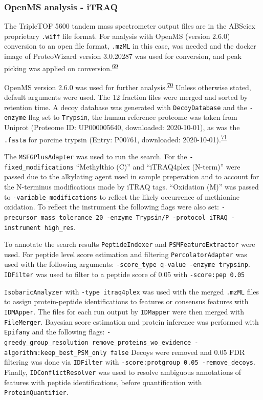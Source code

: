\documentclass[
]{article}
\begin{document}
\hypertarget{openms-chap3}{%
\subsubsection{OpenMS analysis - iTRAQ}\label{openms-chap3}}

The TripleTOF 5600 tandem mass spectrometer output files are in the ABSciex proprietary \texttt{.wiff} file format.
For analysis with OpenMS (version 2.6.0) conversion to an open file format, \texttt{.mzML} in this case, was needed and the docker image of ProteoWizard version 3.0.20287 was used for conversion, and peak picking was applied on conversion.\textsuperscript{\protect\hyperlink{ref-chambers_cross-platform_2012}{69}}

OpenMS version 2.6.0 was used for further analysis.\textsuperscript{\protect\hyperlink{ref-rost_openms_2016}{70}}
Unless otherwise stated, default arguments were used.
The 12 fraction files were merged and sorted by retention time.
A decoy database was generated with \texttt{DecoyDatabase} and the \texttt{-enzyme} flag set to \texttt{Trypsin}, the human reference proteome was taken from Uniprot (Proteome ID: UP000005640, downloaded: 2020-10-01), as was the \texttt{.fasta} for porcine trypsin (Entry: P00761, downloaded: 2020-10-01).\textsuperscript{\protect\hyperlink{ref-the_uniprot_consortium_uniprot_2021}{71}}

The \texttt{MSFGPlusAdapter} was used to run the search.
For the \texttt{-fixed\_modifications} ``Methylthio (C)'' and ``iTRAQ4plex (N-term)'' were passed due to the alkylating agent used in sample preperation and to account for the N-terminus modifications made by iTRAQ tags.
``Oxidation (M)'' was passed to \texttt{-variable\_modifications} to reflect the likely occurrence of methionine oxidation.
To reflect the instrument the following flags were also set: \texttt{-precursor\_mass\_tolerance\ 20\ -enzyme\ Trypsin/P\ -protocol\ iTRAQ\ -instrument\ high\_res}.

To annotate the search results \texttt{PeptideIndexer} and \texttt{PSMFeatureExtractor} were used.
For peptide level score estimation and filtering \texttt{PercolatorAdapter} was used with the following arguments: \texttt{-score\_type\ q-value\ -enzyme\ trypsinp}.
\texttt{IDFilter} was used to filter to a peptide score of 0.05 with \texttt{-score:pep\ 0.05}

\texttt{IsobaricAnalyzer} with \texttt{-type\ itraq4plex} was used with the merged \texttt{.mzML} files to assign protein-peptide identifications to features or consensus features with \texttt{IDMApper}.
The files for each run output by \texttt{IDMapper} were then merged with \texttt{FileMerger}.
Bayesian score estimation and protein inference was performed with \texttt{Epifany} and the following flags: \texttt{-greedy\_group\_resolution\ remove\_proteins\_wo\_evidence\ -algorithm:keep\_best\_PSM\_only\ false}
Decoys were removed and 0.05 FDR filtering was done via \texttt{IDFilter} with \texttt{-score:protgroup\ 0.05\ -remove\_decoys}.
Finally, \texttt{IDConflictResolver} was used to resolve ambiguous annotations of features with peptide identifications, before quantification with \texttt{ProteinQuantifier}.
\end{document}
